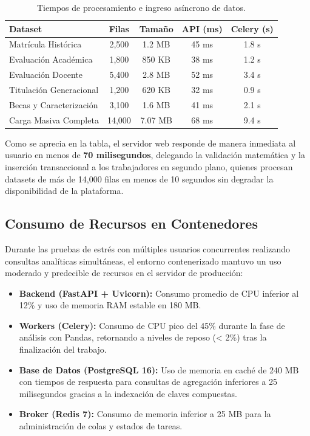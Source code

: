 \begin{table}[H]
\centering
\small
\begin{tabular}{|p{4.2cm}|c|c|c|c|}
\hline
\textbf{Dataset} & \textbf{Filas} & \textbf{Tamaño} & \textbf{API (ms)} & \textbf{Celery (s)} \\
\hline
Matrícula Histórica & 2,500 & 1.2 MB & 45 ms & 1.8 s \\
\hline
Evaluación Académica & 1,800 & 850 KB & 38 ms & 1.2 s \\
\hline
Evaluación Docente & 5,400 & 2.8 MB & 52 ms & 3.4 s \\
\hline
Titulación Generacional & 1,200 & 620 KB & 32 ms & 0.9 s \\
\hline
Becas y Caracterización & 3,100 & 1.6 MB & 41 ms & 2.1 s \\
\hline
Carga Masiva Completa & 14,000 & 7.07 MB & 68 ms & 9.4 s \\
\hline
\end{tabular}
\caption{Tiempos de procesamiento e ingreso asíncrono de datos.}
\label{tab:rendimiento_cargas}
\end{table}

Como se aprecia en la tabla, el servidor web responde de manera inmediata al usuario en menos de \textbf{70 milisegundos}, delegando la validación matemática y la inserción transaccional a los trabajadores en segundo plano, quienes procesan datasets de más de 14,000 filas en menos de 10 segundos sin degradar la disponibilidad de la plataforma.

\subsection{Consumo de Recursos en Contenedores}

Durante las pruebas de estrés con múltiples usuarios concurrentes realizando consultas analíticas simultáneas, el entorno contenerizado mantuvo un uso moderado y predecible de recursos en el servidor de producción:
\begin{itemize}
    \item \textbf{Backend (FastAPI + Uvicorn):} Consumo promedio de CPU inferior al 12\% y uso de memoria RAM estable en 180 MB.
    \item \textbf{Workers (Celery):} Consumo de CPU pico del 45\% durante la fase de análisis con Pandas, retornando a niveles de reposo (< 2\%) tras la finalización del trabajo.
    \item \textbf{Base de Datos (PostgreSQL 16):} Uso de memoria en caché de 240 MB con tiempos de respuesta para consultas de agregación inferiores a 25 milisegundos gracias a la indexación de claves compuestas.
    \item \textbf{Broker (Redis 7):} Consumo de memoria inferior a 25 MB para la administración de colas y estados de tareas.
\end{itemize}

